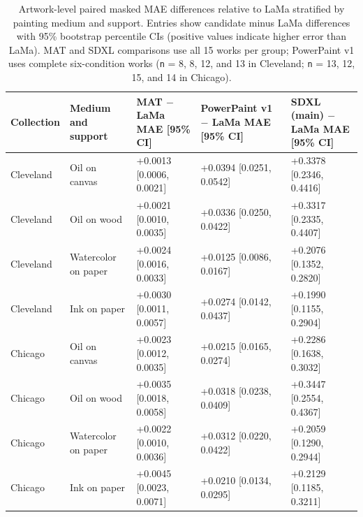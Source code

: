 \begin{table}[!htb]
\caption{Artwork-level paired masked MAE differences relative to LaMa stratified by painting medium and support. Entries show candidate minus LaMa differences with 95\% bootstrap percentile CIs (positive values indicate higher error than LaMa). MAT and SDXL comparisons use all 15 works per group; PowerPaint v1 uses complete six-condition works (\texttt{n} = 8, 8, 12, and 13 in Cleveland; \texttt{n} = 13, 12, 15, and 14 in Chicago).}\label{table:7}
\centering
\fontsize{10}{12}\selectfont
\setlength{\tabcolsep}{3pt}
\renewcommand{\arraystretch}{1.2}
\begin{tabular}{>{\raggedright\arraybackslash}p{}>{\raggedright\arraybackslash}p{}>{\raggedright\arraybackslash}p{}>{\raggedright\arraybackslash}p{}>{\raggedright\arraybackslash}p{}}
\toprule
\textbf{Collection} & \textbf{Medium and support} & \textbf{MAT \ensuremath{-} LaMa MAE [95\% CI]} & \textbf{PowerPaint v1 \ensuremath{-} LaMa MAE [95\% CI]} & \textbf{SDXL (main) \ensuremath{-} LaMa MAE [95\% CI]} \\
\midrule
Cleveland & Oil on canvas & +0.0013 [0.0006, 0.0021] & +0.0394 [0.0251, 0.0542] & +0.3378 [0.2346, 0.4416] \\
Cleveland & Oil on wood & +0.0021 [0.0010, 0.0035] & +0.0336 [0.0250, 0.0422] & +0.3317 [0.2335, 0.4407] \\
Cleveland & Watercolor on paper & +0.0024 [0.0016, 0.0033] & +0.0125 [0.0086, 0.0167] & +0.2076 [0.1352, 0.2820] \\
Cleveland & Ink on paper & +0.0030 [0.0011, 0.0057] & +0.0274 [0.0142, 0.0437] & +0.1990 [0.1155, 0.2904] \\
Chicago & Oil on canvas & +0.0023 [0.0012, 0.0035] & +0.0215 [0.0165, 0.0274] & +0.2286 [0.1638, 0.3032] \\
Chicago & Oil on wood & +0.0035 [0.0018, 0.0058] & +0.0318 [0.0238, 0.0409] & +0.3447 [0.2554, 0.4367] \\
Chicago & Watercolor on paper & +0.0022 [0.0010, 0.0036] & +0.0312 [0.0220, 0.0422] & +0.2059 [0.1290, 0.2944] \\
Chicago & Ink on paper & +0.0045 [0.0023, 0.0071] & +0.0210 [0.0134, 0.0295] & +0.2129 [0.1185, 0.3211] \\
\bottomrule
\end{tabular}
\end{table}
